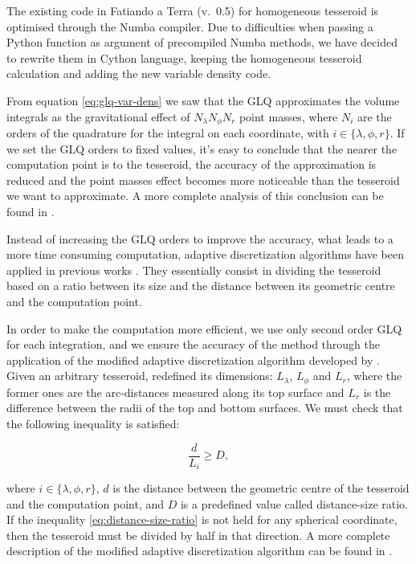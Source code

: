 \documentclass[extra]{gji}
\begin{document}
The existing code in Fatiando a Terra (v.~0.5) for homogeneous tesseroid is optimised through the Numba compiler.
Due to difficulties when passing a Python function as argument of precompiled Numba methods, we have decided to rewrite them in Cython language, keeping the homogeneous tesseroid calculation and adding the new variable density code.

From equation \ref{eq:glq-var-dens} we saw that the GLQ approximates the volume integrals as the gravitational effect of $N_\lambda N_\phi N_r$ point masses, where $N_i$ are the orders of the quadrature for the integral on each coordinate, with $i \in \{ \lambda, \phi, r \}$.
If we set the GLQ orders to fixed values, it's easy to conclude that the nearer the computation point is to the tesseroid, the accuracy of the approximation is reduced and the point masses effect becomes more noticeable than the tesseroid we want to approximate.
A more complete analysis of this conclusion can be found in \citet{Ku1977, Li2011, Uieda2016}.

Instead of increasing the GLQ orders to improve the accuracy, what leads to a more time consuming computation, adaptive discretization algorithms have been applied in previous works \citep{Li2011, Uieda2016}.
They essentially consist in dividing the tesseroid based on a ratio between its size and the distance between its geometric centre and the computation point.

In order to make the computation more efficient, we use only second order GLQ for each integration, and we ensure the accuracy of the method through the application of the modified adaptive discretization algorithm developed by \citet{Uieda2016}.
Given an arbitrary tesseroid, \citet{Uieda2016} redefined its dimensions: $L_\lambda$, $L_\phi$ and $L_r$, where the former ones are the arc-distances measured along its top surface and $L_r$ is the difference between the radii of the top and bottom surfaces.
We must check that the following inequality is satisfied:

\begin{equation}
    \frac{d}{L_i} \geq D,
\label{eq:distance-size-ratio}
\end{equation}

\noindent where $i \in \{\lambda, \phi, r\}$, $d$ is the distance between the geometric centre of the tesseroid and the computation point, and $D$ is a predefined value called distance-size ratio.
If the inequality \ref{eq:distance-size-ratio} is not held for any spherical coordinate, then the tesseroid must be divided by half in that direction.
A more complete description of the modified adaptive discretization algorithm can be found in \citet{Uieda2016}.
\end{document}
